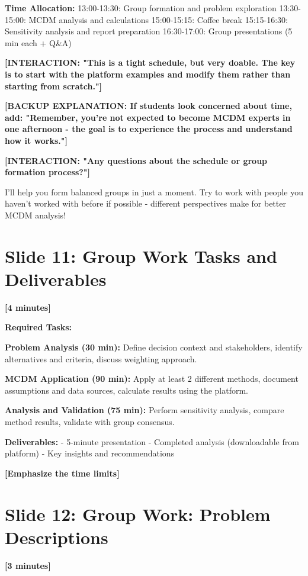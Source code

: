 \documentclass[12pt]{article}
\begin{document}
\textcolor{emphasis}{\textbf{Time Allocation:}}
13:00-13:30: Group formation and problem exploration
13:30-15:00: MCDM analysis and calculations
15:00-15:15: Coffee break
15:15-16:30: Sensitivity analysis and report preparation
16:30-17:00: Group presentations (5 min each + Q&A)

\textcolor{speakernote}{\textbf{[INTERACTION: "This is a tight schedule, but very doable. The key is to start with the platform examples and modify them rather than starting from scratch."]}}

\textcolor{speakernote}{\textbf{[BACKUP EXPLANATION: If students look concerned about time, add: "Remember, you're not expected to become MCDM experts in one afternoon - the goal is to experience the process and understand how it works."]}}

\textcolor{speakernote}{\textbf{[INTERACTION: "Any questions about the schedule or group formation process?"]}}

I'll help you form balanced groups in just a moment. Try to work with people you haven't worked with before if possible - different perspectives make for better MCDM analysis!

\section*{Slide 11: Group Work Tasks and Deliverables}
\textcolor{timing}{\textbf{[4 minutes]}}

\textcolor{emphasis}{\textbf{Required Tasks:}}

\textcolor{emphasis}{\textbf{Problem Analysis (30 min):}} Define decision context and stakeholders, identify alternatives and criteria, discuss weighting approach.

\textcolor{emphasis}{\textbf{MCDM Application (90 min):}} Apply at least 2 different methods, document assumptions and data sources, calculate results using the platform.

\textcolor{emphasis}{\textbf{Analysis and Validation (75 min):}} Perform sensitivity analysis, compare method results, validate with group consensus.

\textcolor{emphasis}{\textbf{Deliverables:}}
- 5-minute presentation
- Completed analysis (downloadable from platform)
- Key insights and recommendations

\textcolor{speakernote}{\textbf{[Emphasize the time limits]}}

\section*{Slide 12: Group Work: Problem Descriptions}
\textcolor{timing}{\textbf{[3 minutes]}}
\end{document}
